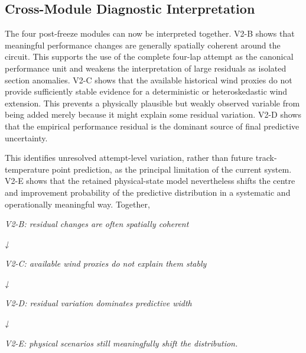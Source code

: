 \subsection{Cross-Module Diagnostic Interpretation}
The four post-freeze modules can now be interpreted together. V2-B shows that meaningful performance changes are generally spatially coherent around the circuit. This supports the use of the complete four-lap attempt as the canonical performance unit and weakens the interpretation of large residuals as isolated section anomalies. V2-C shows that the available historical wind proxies do not provide sufficiently stable evidence for a deterministic or heteroskedastic wind extension. This prevents a physically plausible but weakly observed variable from being added merely because it might explain some residual variation. V2-D shows that the empirical performance residual is the dominant source of final predictive uncertainty.

This identifies unresolved attempt-level variation, rather than future track-temperature point prediction, as the principal limitation of the current system. V2-E shows that the retained physical-state model nevertheless shifts the centre and improvement probability of the predictive distribution in a systematic and operationally meaningful way. Together,

\begin{center}\textit{V2-B: residual changes are often spatially coherent}\end{center}

\begin{center}\textit{↓}\end{center}

\begin{center}\textit{V2-C: available wind proxies do not explain them stably}\end{center}

\begin{center}\textit{↓}\end{center}

\begin{center}\textit{V2-D: residual variation dominates predictive width}\end{center}

\begin{center}\textit{↓}\end{center}

\begin{center}\textit{V2-E: physical scenarios still meaningfully shift the distribution.}\end{center}

